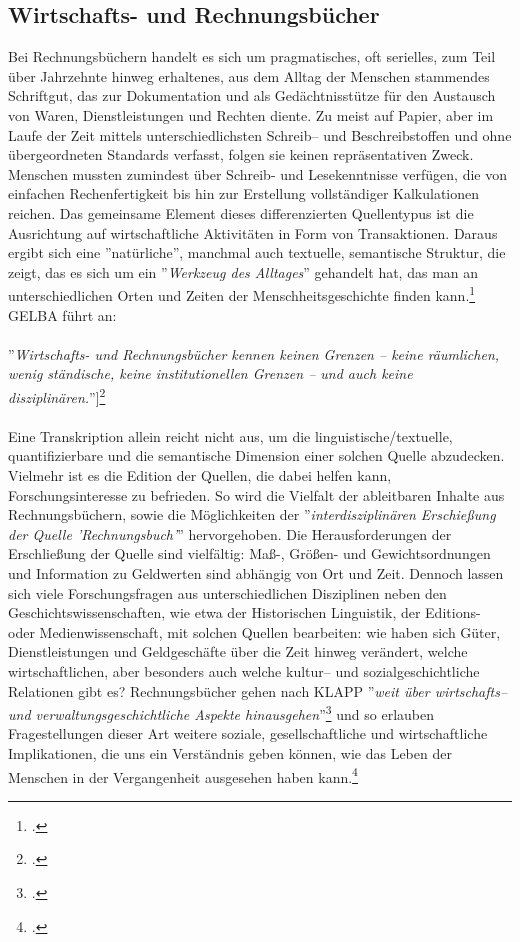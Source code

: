 \documentclass[12pt,a4paper]{article}
\begin{document}
\subsection{Wirtschafts- und Rechnungsbücher}

Bei Rechnungsbüchern handelt es sich um pragmatisches, oft serielles, zum Teil über Jahrzehnte hinweg erhaltenes, aus dem Alltag der Menschen stammendes Schriftgut, das zur Dokumentation und als Gedächtnisstütze für den Austausch von Waren, Dienstleistungen und Rechten diente. Zu meist auf Papier, aber im Laufe der Zeit mittels unterschiedlichsten Schreib-- und Beschreibstoffen und ohne übergeordneten Standards verfasst, folgen sie keinen repräsentativen Zweck. Menschen mussten zumindest über Schreib- und Lesekenntnisse verfügen, die von einfachen Rechenfertigkeit bis hin zur Erstellung vollständiger Kalkulationen reichen. Das gemeinsame Element dieses differenzierten Quellentypus ist die Ausrichtung auf wirtschaftliche Aktivitäten in Form von Transaktionen. Daraus ergibt sich eine ''natürliche'', manchmal auch textuelle, semantische Struktur, die zeigt, das es sich um ein ''\textit{Werkzeug des Alltages}'' gehandelt hat, das man an unterschiedlichen Orten und Zeiten der Menschheitsgeschichte finden kann.\footcite[][S.2]{tomasekmedea} GELBA führt an:
\\
\\
''\textit{Wirtschafts- und Rechnungsbücher kennen keinen Grenzen -- keine räumlichen, wenig ständische, keine institutionellen Grenzen -- und auch keine disziplinären.}'']\footcite[Vgl.][S.51]{gleba2016rechnen}
\\
\\
Eine Transkription allein reicht nicht aus, um die linguistische/textuelle, quantifizierbare und die semantische Dimension einer solchen Quelle abzudecken. Vielmehr ist es die Edition der Quellen, die dabei helfen kann, Forschungsinteresse zu befrieden. So wird die Vielfalt der ableitbaren Inhalte aus Rechnungsbüchern, sowie die Möglichkeiten der ''\textit{interdisziplinären Erschießung der Quelle 'Rechnungsbuch'}'' hervorgehoben. Die Herausforderungen der Erschließung der Quelle sind vielfältig: Maß-, Größen- und Gewichtsordnungen und Information zu Geldwerten sind abhängig von Ort und Zeit. Dennoch lassen sich viele Forschungsfragen aus unterschiedlichen Disziplinen neben den Geschichtswissenschaften, wie etwa der Historischen Linguistik, der Editions- oder Medienwissenschaft, mit solchen Quellen bearbeiten: wie haben sich Güter, Dienstleistungen und Geldgeschäfte über die Zeit hinweg verändert, welche wirtschaftlichen, aber besonders auch welche kultur-- und sozialgeschichtliche Relationen gibt es? Rechnungsbücher gehen nach KLAPP ''\textit{weit über wirtschafts-- und verwaltungsgeschichtliche
Aspekte hinausgehen}''\footcite[][S.14]{bauch2015daten} und so erlauben Fragestellungen dieser Art weitere soziale, gesellschaftliche und wirtschaftliche Implikationen, die uns ein Verständnis geben können, wie das Leben der Menschen in der Vergangenheit ausgesehen haben kann.\footcite[][S.7-10]{gleba2015einleitung}
\end{document}
